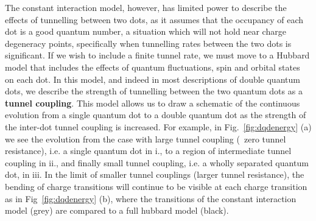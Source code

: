 The constant interaction model, however, has limited power to describe the effects of tunnelling between two dots,
as it assumes that the occupancy of each dot is a good quantum number, a situation which will not hold near
charge degeneracy points, specifically when tunnelling rates between the two dots is significant. If we wish to include a finite tunnel
rate, we must move to a Hubbard model that includes the effects of quantum fluctuations, spin and orbital states on each
dot\cite{PhysRevB.84.115301}. In this model, and indeed in most descriptions of double quantum dots, we
describe the strength of tunnelling between the two quantum dots as a \textbf{tunnel coupling}. This model allows us to draw a schematic
of the continuous evolution from a single quantum dot to a double quantum dot as the strength of the inter-dot tunnel coupling
is increased. For example, in Fig.~\ref{fig:dqdenergy} (a) we see the evolution from the case with large tunnel coupling (~zero tunnel resistance), i.e. a single
quantum dot in i., to a region of intermediate tunnel coupling in ii., and finally small tunnel coupling, i.e. a wholly separated quantum dot, in iii. In the
limit of smaller tunnel couplings (larger tunnel resistance), the bending of charge transitions will continue to be visible
at each charge transition as in Fig~\ref{fig:dqdenergy} (b), where the transitions of the constant interaction model (grey) are compared to
a full hubbard model (black).

